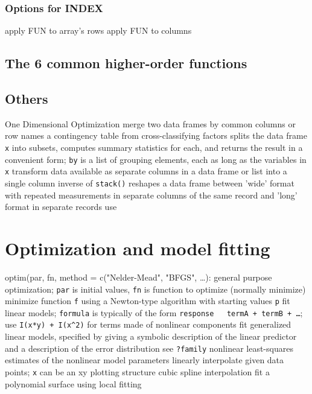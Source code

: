 \subsubsection{Options for INDEX}
	{apply FUN to array's rows}
	{apply FUN to columns}

\subsection{The 6 common higher-order functions}{}

\subsection{Others}{}
	{One Dimensional Optimization}
	{merge two data frames by com\-mon col\-umns or row names}
	{a contingency table from cross-classi\-fy\-ing factors}
	{splits the data frame {\tt x} into subsets,
computes summary statistics for each, and returns the result in a convenient
form; {\tt by} is a list of grouping elements, each as long as the variables in
{\tt x}}
	{transform data available as se\-pa\-rate col\-umns in
a data frame or list into a single column}
	{inverse of {\tt stack()}}
	{reshapes a data frame between 'wide' format
    with re\-pea\-ted mea\-sure\-ments in separate
    columns of the same record and 'long' format in separate records}
	{use}

\section{Optimization and model fitting}{{\smalltt optim(par, fn, method =
c("Nelder-Mead", "BFGS", \ldots)}: general purpose optimization; {\tt par} is
initial values, {\tt fn} is function to optimize (normally minimize)}
	{minimize function {\tt f} using a Newton-type algorithm with
starting values {\tt p}}
	{fit linear models; {\tt formula} is typically of the form
{\tt response ~ termA + termB + \ldots}; use {\tt I(x*y) + I(x\^{}2)} for terms
made of nonlinear components}
	{fit generalized linear models, specified by giving
a symbolic description of the linear predictor and a description of the error
distribution}
	{see {\tt ?family}}
	{nonlinear least-squares estimates of the nonlinear model
parameters}
	{linearly interpolate given data points; {\tt x} can be an
xy plotting structure}
	{cubic spline interpolation}
	{fit a polynomial surface using local fitting}

